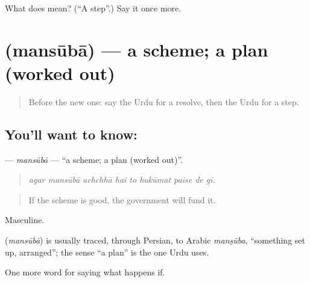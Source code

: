 \begin{tcolorbox}[breakable,colback=teal!4,colframe=teal!35!black,title={Before you move on}]
What does  mean? (\textquotedblleft{}A step\textquotedblright{}.) Say it once more.
\end{tcolorbox}
\section[\texorpdfstring{\ur{منصوبہ} (mansūbā)}{منصوبہ (mansūbā)}]{ (mansūbā) — a scheme; a plan (worked out)}

\label{lesson:UR-C378-mansuba}



\begin{quote}
Before the new one: say the Urdu for a resolve, then the Urdu for a step.
\end{quote}

\subsection*{You'll want to know: }
\textbf{} — \emph{mansūbā} — \textquotedblleft{}a scheme; a plan (worked out)\textquotedblright{}.

\begin{quote}
        
\end{quote}

\begin{quote}
\emph{agar mansūbā achchhā hai to hukūmat paise de gī.}
\end{quote}

\begin{quote}
If the scheme is good, the government will fund it.
\end{quote}

Masculine.

\begin{cousinweb}
\textbf{} (\emph{mansūbā}) is usually traced, through Persian, to Arabic \emph{manṣūba}, \textquotedblleft{}something set up, arranged\textquotedblright{}; the sense \textquotedblleft{}a plan\textquotedblright{} is the one Urdu uses.
\end{cousinweb}

\begin{grammarlens}[title={What you've built}]
One more word for saying what happens if.
\end{grammarlens}

